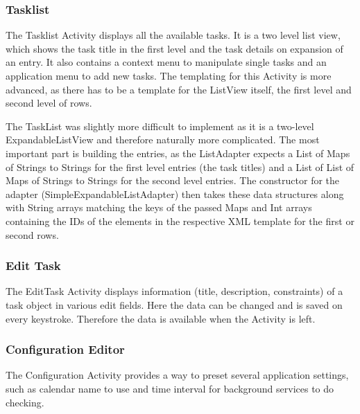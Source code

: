 
\subsubsection{Tasklist} %
\label{ssub:Tasklist}
The Tasklist Activity displays all the available tasks. It is a two level
list view, which shows the task title in the first level and the task details
on expansion of an entry. It also contains a context menu to manipulate single
tasks and an application menu to add new tasks. The templating for this
Activity is more advanced, as there has to be a template for the ListView
itself, the first level and second level of rows.

The TaskList was slightly more difficult to implement as it is a two-level
ExpandableListView and therefore naturally more complicated. The most important
part is building the entries, as the ListAdapter expects a List of Maps of
Strings to Strings for the first level entries (the task titles) and a List
of List of Maps of Strings to Strings for the second level entries. The
constructor for the adapter (SimpleExpandableListAdapter) then takes these
data structures along with String arrays matching the keys of the passed Maps
and Int arrays containing the IDs of the elements in the respective XML
template for the first or second rows.


\subsubsection{Edit Task} %
\label{ssub:EditTask}
The EditTask Activity displays information (title, description, constraints)
of a task object in various edit fields. Here the data can be changed and
is saved on every keystroke. Therefore the data is available when the
Activity is left.


\subsubsection{Configuration Editor} %
\label{ssub:ConfigurationEditor}
The Configuration Activity provides a way to preset several application
settings, such as calendar name to use and time interval for background
services to do checking.


